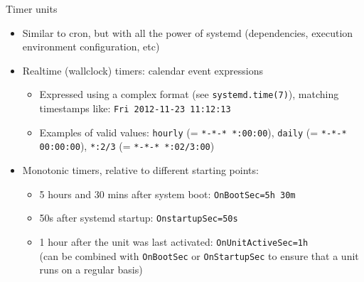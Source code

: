 \documentclass[11pt,final,usepdftitle=false]{beamer}
\begin{document}
\begin{frame}{Timer units}
	\begin{itemize}
		\item Similar to cron, but with all the power of systemd (dependencies, execution environment configuration, etc)
		\hbr
	\item \alert{Realtime (wallclock) timers}: calendar event expressions
			\begin{itemize}
				\item Expressed using a complex format (see \texttt{systemd.time(7)}), matching timestamps like:
					\texttt{Fri 2012-11-23 11:12:13}
				\hbr
			\item Examples of valid values:  \texttt{hourly} (= \texttt{*-*-* *:00:00}), \texttt{daily} (= \texttt{*-*-* 00:00:00}), \texttt{*:2/3} (= \texttt{*-*-* *:02/3:00})
		\end{itemize}
		\hbr
	\item \alert{Monotonic timers}, relative to different starting points:
		\begin{itemize}
			\item 5 hours and 30 mins after system boot: \texttt{OnBootSec=5h 30m}
				\hbr
			\item 50s after systemd startup: \texttt{OnstartupSec=50s}
				\hbr
			\item 1 hour after the unit was last activated: \texttt{OnUnitActiveSec=1h}\\
				(can be combined with \texttt{OnBootSec} or \texttt{OnStartupSec} to ensure that a unit runs on a regular basis)
		\end{itemize}
	\end{itemize}
\end{frame}
\end{document}
